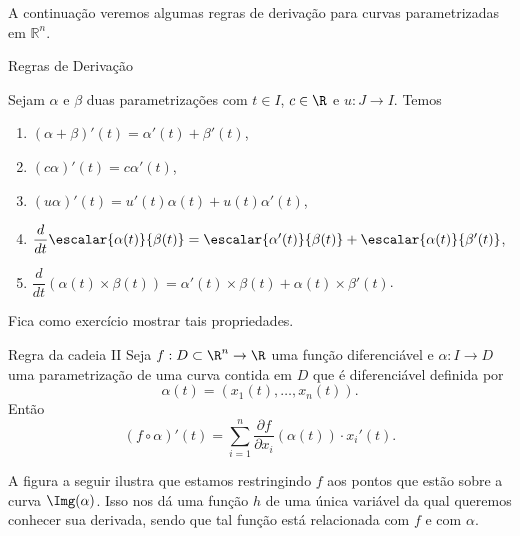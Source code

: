 A continuação veremos algumas regras de derivação para curvas parametrizadas em \(\mathbb{R}^n\).  

\begin{properties}{Regras de Derivação}{}


Sejam $\alpha$ e $\beta$ duas parametrizações com $t\in I$, $c\in\R$ e $u:J\to I$. Temos 
\begin{enumerate}[label=\color{resultscolor!140}\arabic*.]
    \item $(\alpha+\beta)'(t)=\alpha'(t)+\beta'(t)$,

    \item $(c\alpha)'(t)=c\alpha'(t)$,

    \item $(u\alpha)'(t)=u'(t)\alpha (t)+u(t)\alpha'(t)$, 

    \item $\dfrac{d}{dt}\escalar{\alpha(t)}{\beta(t)}=\escalar{\alpha'(t)}{\beta(t)}+\escalar{\alpha(t)}{\beta'(t)}$,

    \item $\dfrac{d}{dt} (\alpha(t)\times \beta (t))=\alpha'(t)\times\beta(t)+\alpha(t)\times\beta'(t)$. 
    
\end{enumerate}


\end{properties}

Fica como exercício mostrar tais propriedades. 









\begin{theorem}{Regra da cadeia II}{}
Seja $f:D\subset \R^n\to\R$ uma função diferenciável e $\alpha:I\to D$ uma parametrização de uma curva contida em $D$ que é diferenciável definida por
$$\alpha(t)=(x_1(t),\dots,x_n(t)).$$
Então 
\begin{equation}\label{eq:regra_cadeia}
(f\circ\alpha)'(t)=\sum_{i=1}^n \dfrac{\partial f}{\partial x_i}(\alpha(t))\cdot x_i'(t).
\end{equation}
\end{theorem}

A figura a seguir ilustra que estamos restringindo $f$ aos pontos que estão sobre a curva $\Img(\alpha)$. Isso nos dá uma função $h$ de uma única variável da qual queremos conhecer sua derivada, sendo que tal função está relacionada com $f$ e com $\alpha$.  




